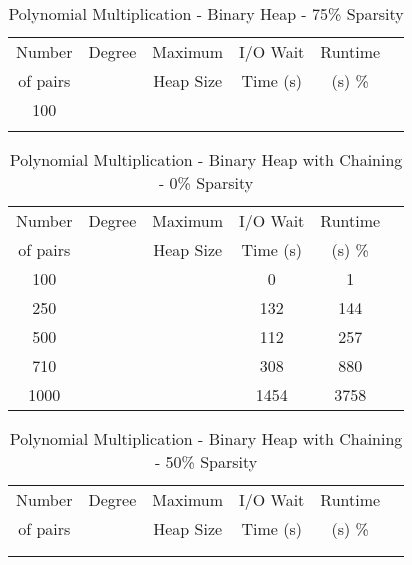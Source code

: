 \documentclass[11pt, one-sided]{amsart}
\begin{document}
\begin{table}[htbp]
   \centering
      \caption{Polynomial Multiplication - Binary Heap - 75\% Sparsity}
   \begin{tabular}{|c|c|c|c|c|c|}
   	\hline
		 Number   & 	Degree	& Maximum & I/O Wait		& Runtime 	 \\ 
		 of pairs 	&			& Heap Size	& Time (s)		&	(s)		 		\%				\\ \hline
		 100		&			&			&			&						\\
		 		&			&			&			&						\\
   \end{tabular}
   \label{tab:booktabs}
\end{table}


\newpage



\begin{table}[htbp]
   \centering
      \caption{Polynomial Multiplication - Binary Heap with Chaining - 0\% Sparsity}
   \begin{tabular}{|c|c|c|c|c|c|}
   	\hline
		 Number   & 	Degree	& Maximum & I/O Wait		& Runtime 	 \\ 
		 of pairs 	&			& Heap Size	& Time (s)		&	(s)		 		\%				\\ \hline
		 100		&			&			&	0		&	1					\\
		 250		&			&			&	132		&	144					\\
		 500		&			&			&	112		&	257					\\
		 710		&			&			&	308		&	880					\\				
		 1000	&			&			&	1454		&	3758					\\
	\hline
   \end{tabular}
   \label{tab:booktabs}
\end{table}

\begin{table}[htbp]
   \centering
      \caption{Polynomial Multiplication - Binary Heap with Chaining - 50\% Sparsity}
   \begin{tabular}{|c|c|c|c|c|c|}
   	\hline
		 Number   & 	Degree	& Maximum & I/O Wait		& Runtime 	 \\ 
		 of pairs 	&			& Heap Size	& Time (s)		&	(s)		 		\%				\\ \hline
		 		&			&			&			&						\\
		 		&			&			&			&						\\
   \end{tabular}
   \label{tab:booktabs}
\end{table}
\end{document}
